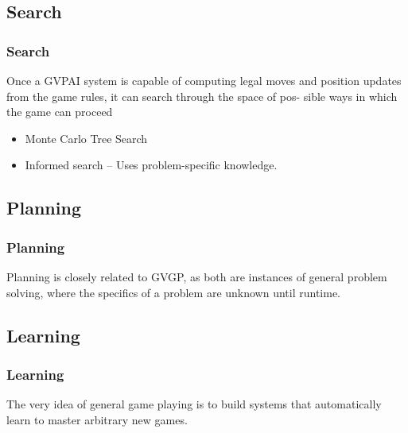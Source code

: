 \documentclass{beamer}
\begin{document}
\subsection{Search\cite{12}}
\begin{frame}
  \frametitle{Search}
  Once a GVPAI system is capable of computing legal moves and position updates from the game rules, it can search through the space of pos- sible ways in which the game can proceed
  \begin{itemize}
    \item Monte Carlo Tree Search
    \item Informed search -- Uses problem-specific knowledge.
  \end{itemize}

\end{frame}

\subsection{Planning}
\begin{frame}
  \frametitle{Planning}
  Planning is closely related to GVGP, as both are instances of general problem solving, where the specifics of a problem are unknown until runtime.
\end{frame}

\subsection{Learning}
\begin{frame}
  \frametitle{Learning}
  The very idea of general game playing is to build systems that automatically learn to master arbitrary new games.
  

\end{frame}

\end{document}
